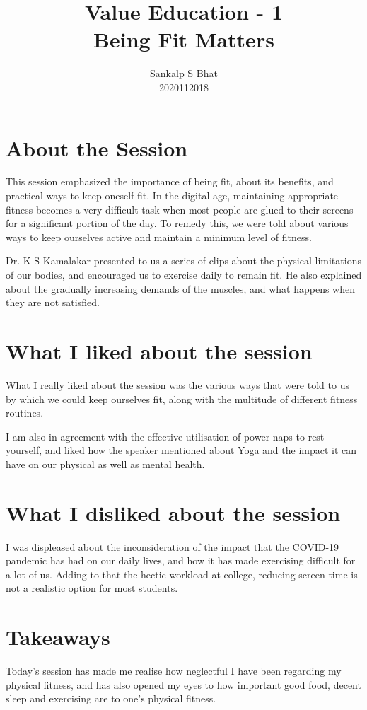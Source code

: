 \documentclass[a4paper, 12pt]{extarticle}
\title{Value Education - 1\\
Being Fit Matters
}
\author{Sankalp S Bhat\\
2020112018
}
\begin{document}
\maketitle
\thispagestyle{empty}

\section*{About the Session}
This session emphasized the importance of being fit, about its benefits, and practical ways to keep oneself fit. In the digital age, maintaining appropriate fitness becomes a very difficult task when most people are glued to their screens for a significant portion of the day. To remedy this, we were told about various ways to keep ourselves active and maintain a minimum level of fitness.

Dr. K S Kamalakar presented to us a series of clips about the physical limitations of our bodies, and encouraged us to exercise daily to remain fit. He also explained about the gradually increasing demands of the muscles, and what happens when they are not satisfied.
      
\section*{What I liked about the session}

What I really liked about the session was the various ways that were told to us by which we could keep ourselves fit, along with the multitude of different fitness routines.
    
I am also in agreement with the effective utilisation of power naps to rest yourself, and liked how the speaker mentioned about Yoga and the impact it can have on our physical as well as mental health.
     
 \section*{What I disliked about the session}
 
I was displeased about the inconsideration of the impact that the COVID-19 pandemic has had on our daily lives, and how it has made exercising difficult for a lot of us. Adding to that the hectic workload at college, reducing screen-time is not a realistic option for most students.

 \section*{Takeaways}
    
Today's session has made me realise how neglectful I have been regarding my physical fitness, and has also opened my eyes to how important good food, decent sleep and exercising are to one's physical fitness.
\end{document}
